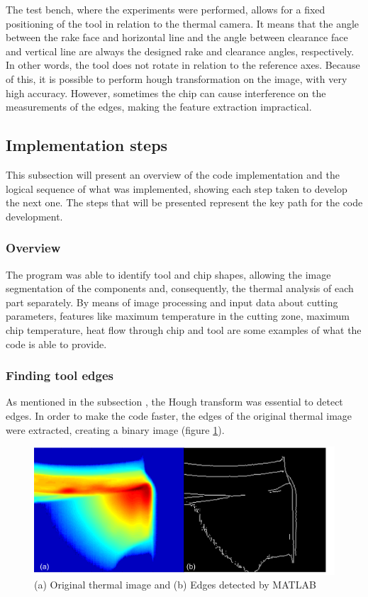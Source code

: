 			The test bench, where the experiments were performed, allows for a fixed positioning of the tool in relation to the thermal camera. It means that the angle between the rake face and horizontal line and the angle between clearance face and vertical line are always the designed rake and clearance angles, respectively. In other words, the tool does not rotate in relation to the reference axes. Because of this, it is possible to perform hough transformation on the image, with very high accuracy. However, sometimes the chip can cause interference on the measurements of the edges, making the feature extraction impractical.

	\subsection{Implementation steps}

		This subsection will present an overview of the code implementation and the logical sequence of what was implemented, showing each step taken to develop the next one. The steps that will be presented represent the key path for the code development.

		\subsubsection{Overview}	

			The program was able to identify tool and chip shapes, allowing the image segmentation of the components and, consequently, the thermal analysis of each part separately. By means of image processing and input data about cutting parameters, features like maximum temperature in the cutting zone, maximum chip temperature, heat flow through chip and tool are some examples of what the code is able to provide.	
			
		\subsubsection{Finding tool edges}

			As mentioned in the subsection , the Hough transform was essential to detect edges. In order to make the code faster, the edges of the original thermal image were extracted, creating a binary image (figure \ref{fig:edges}).

			\begin{figure}[H]
			\centering
			\captionsetup{justification=centering}
			\includegraphics[scale = 0.5]{Imagens/edges.png}
			\caption{(a) Original thermal image and (b) Edges detected by MATLAB}
			\label{fig:edges}
			\end{figure}

